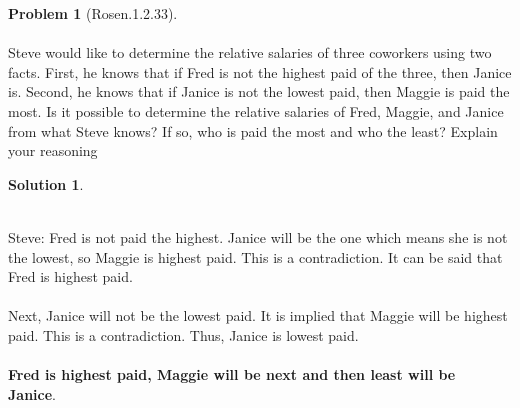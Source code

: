 \documentclass{article}
\theoremstyle{definition}
\newtheorem*{problem}{Problem}
\newtheorem*{solution}{Solution}
\begin{document}
\begin{problem}[Rosen.1.2.33]\ \\
\ \\
Steve would like to determine the relative salaries of three
coworkers using two facts. First, he knows that if Fred
is not the highest paid of the three, then Janice is. Second,
he knows that if Janice is not the lowest paid, then
Maggie is paid the most. Is it possible to determine the
relative salaries of Fred, Maggie, and Janice from what
Steve knows? If so, who is paid the most and who the
least? Explain your reasoning\ \\
\begin{compactenum}
\renewcommand{\theenumi}{\alph{enumi}}
\end{compactenum}
\end{problem}

\begin{solution}\ \\
\ \\
\begin{compactenum}
\renewcommand{\theenumi}{\alph{enumi}} 

Steve: Fred is not paid the highest. Janice will be the one which means she is not the lowest, so Maggie is highest paid. This is a contradiction. It can be said that Fred is highest paid.\ \\
\ \\
Next, Janice will not be the lowest paid. It is implied that Maggie will be highest paid. This is a contradiction. Thus, Janice is lowest paid.\ \\
\ \\
\textbf{Fred is highest paid, Maggie will be next and then least will be Janice}.\ \\
\ \\


\end{compactenum}
\end{solution}
\end{document}
